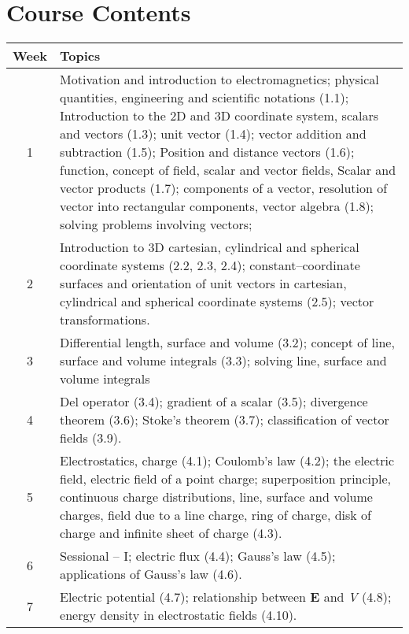 \documentclass[12pt,a4paper]{article}
\begin{document}
\section{Course Contents}
\begin{center}
\vspace{-0.5cm}
	\begin{longtable}{|c|p{13cm}|}
	\hline \hline
		\rule{0pt}{2.6ex} \textbf{Week} & \textbf{Topics}\\
		\hline
		1 \rule{0pt}{2.6ex} & Motivation and introduction to electromagnetics; physical quantities, engineering and scientific notations (1.1); Introduction to the 2D and 3D coordinate system, scalars and vectors (1.3); unit vector (1.4); vector addition and subtraction (1.5); Position and distance vectors (1.6); function, concept of field, scalar and vector fields, Scalar and vector products (1.7); components of a vector, resolution of vector into rectangular components, vector algebra (1.8); solving problems involving vectors;\\
		\hline
		2 \rule{0pt}{2.6ex} & Introduction to 3D cartesian, cylindrical and spherical coordinate systems (2.2, 2.3, 2.4); constant--coordinate surfaces and orientation of unit vectors in cartesian, cylindrical and spherical coordinate systems (2.5); vector transformations.\\
		\hline
		3 \rule{0pt}{2.6ex} & Differential length, surface and volume (3.2); concept of line, surface and volume integrals (3.3); solving line, surface and volume integrals\\
		\hline
		4 \rule{0pt}{2.6ex} & Del operator (3.4); gradient of a scalar (3.5); divergence theorem (3.6); Stoke's theorem (3.7); classification of vector fields (3.9).\\
		\hline
		5 \rule{0pt}{2.6ex} & Electrostatics, charge (4.1); Coulomb's law (4.2); the electric field, electric field of a point charge; superposition principle, continuous charge distributions, line, surface and volume charges,  field due to a line charge, ring of charge, disk of charge and infinite sheet of charge (4.3).\\
		\hline
		6 \rule{0pt}{2.6ex} & Sessional -- I; electric flux (4.4); Gauss's law (4.5); applications of Gauss's law (4.6).\\
		\hline
		7 \rule{0pt}{2.6ex} & Electric potential (4.7); relationship between \textbf{E} and \textit{V} (4.8); energy density in electrostatic fields (4.10).\\

\end{longtable}
\end{center}
\end{document}
